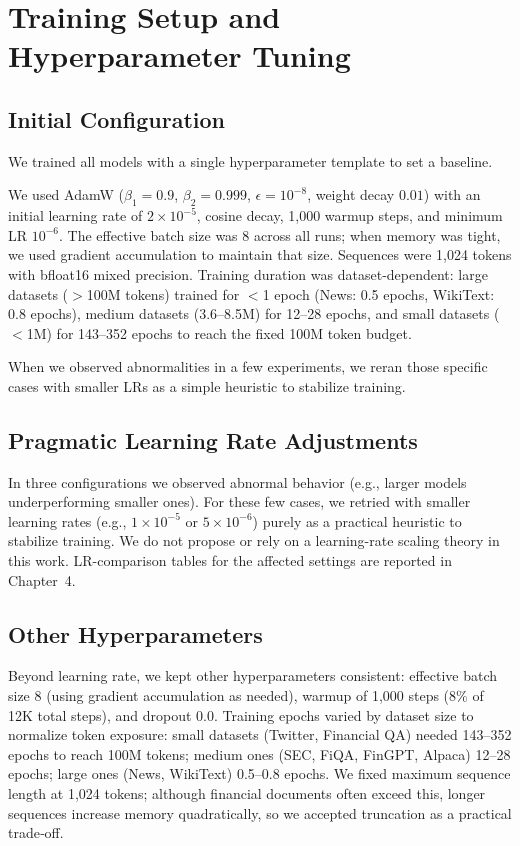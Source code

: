 \section{Training Setup and Hyperparameter Tuning}

\subsection{Initial Configuration}

We trained all models with a single hyperparameter template to set a baseline. 

We used AdamW ($\beta_1=0.9$, $\beta_2=0.999$, $\epsilon=10^{-8}$, weight decay $0.01$) with an initial learning rate of $2\times10^{-5}$, cosine decay, 1{,}000 warmup steps, and minimum LR $10^{-6}$. The effective batch size was 8 across all runs; when memory was tight, we used gradient accumulation to maintain that size. Sequences were 1{,}024 tokens with bfloat16 mixed precision. Training duration was dataset‑dependent: large datasets ($>$100M tokens) trained for $<$1 epoch (News: 0.5 epochs, WikiText: 0.8 epochs), medium datasets (3.6–8.5M) for 12–28 epochs, and small datasets ($<$1M) for 143–352 epochs to reach the fixed 100M token budget.

When we observed abnormalities in a few experiments, we reran those specific cases with smaller LRs as a simple heuristic to stabilize training.

\subsection{Pragmatic Learning Rate Adjustments}

In three configurations we observed abnormal behavior (e.g., larger models underperforming smaller ones). For these few cases, we retried with smaller learning rates (e.g., $1\times 10^{-5}$ or $5\times 10^{-6}$) purely as a practical heuristic to stabilize training. We do not propose or rely on a learning-rate scaling theory in this work. LR-comparison tables for the affected settings are reported in Chapter~4.

\subsection{Other Hyperparameters}

Beyond learning rate, we kept other hyperparameters consistent: effective batch size 8 (using gradient accumulation as needed), warmup of 1{,}000 steps (8\% of 12K total steps), and dropout 0.0. Training epochs varied by dataset size to normalize token exposure: small datasets (Twitter, Financial QA) needed 143–352 epochs to reach 100M tokens; medium ones (SEC, FiQA, FinGPT, Alpaca) 12–28 epochs; large ones (News, WikiText) 0.5–0.8 epochs. We fixed maximum sequence length at 1{,}024 tokens; although financial documents often exceed this, longer sequences increase memory quadratically, so we accepted truncation as a practical trade‑off.


